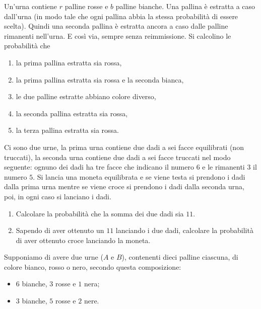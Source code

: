 
Un'urna contiene $r$ palline rosse e $b$ palline bianche. Una pallina è estratta a caso dall'urna (in modo tale che ogni pallina abbia la stessa probabilità di essere scelta). Quindi una seconda pallina è estratta ancora a caso dalle palline rimanenti nell'urna. E così via, sempre senza reimmissione. Si calcolino le probabilità che
\begin{enumerate}
	\item la prima pallina estratta sia rossa,
	\item la prima pallina estratta sia rossa e la seconda bianca,
	\item le due palline estratte abbiano colore diverso,
	\item la seconda pallina estratta sia rossa,
	\item la terza pallina estratta sia rossa.
\end{enumerate}

\Esercizio{}

Ci sono due urne, la prima urna contiene due dadi a sei facce equilibrati (non truccati), la seconda urna contiene due dadi a sei facce truccati nel modo seguente: ognuno dei dadi ha tre facce che indicano il numero $6$ e le rimanenti $3$ il numero $5$. Si lancia una moneta equilibrata e se viene testa si prendono i dadi dalla prima urna mentre se viene croce si prendono i dadi dalla seconda urna, poi, in ogni caso si lanciano i dadi.
\begin{enumerate}
	\item Calcolare la probabilità che la somma dei due dadi sia $11$.
	\item Sapendo di aver ottenuto un $11$ lanciando i due dadi, calcolare la probabilità di aver ottenuto croce lanciando la moneta.
\end{enumerate}

\Esercizio{}

Supponiamo di avere due urne ($A$ e $B$), contenenti dieci palline ciascuna, di colore bianco, rosso o nero, secondo questa composizione:
\begin{itemize}
	\item $6$ bianche, $3$ rosse e $1$ nera;
	\item $3$ bianche, $5$ rosse e $2$ nere.
\end{itemize}

